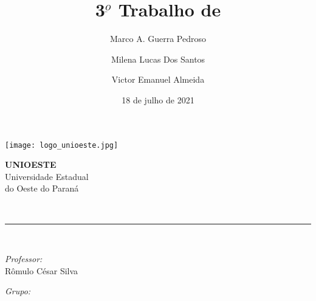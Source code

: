 \documentclass[12pt, a4paper]{article}
\author{Marco A. Guerra Pedroso\and Milena Lucas Dos Santos\and Victor Emanuel Almeida}
\title{3$^{\underbar{o}}$ Trabalho de \materia}
\date{18 de julho de 2021}
\newcommand{\prof}{Rômulo César Silva}
\begin{document}
\begin{titlepage}
    \centering
    \thispagestyle{fancy}

    \begin{minipage}{0.4\textwidth}
        \begin{flushleft}
            \texttt{[image: logo\_unioeste.jpg]}\\[1.0 cm]
        \end{flushleft}
    \end{minipage}
    \begin{minipage}{0.5\textwidth}
        \begin{flushright}\large
            \textsc{\LARGE\textbf{UNIOESTE}}\\
            \vspace{1cm}
            Universidade Estadual\\do Oeste do Paraná
        \end{flushright}
    \end{minipage}
    \vspace*{4.5 cm}

    {\huge\bfseries\thetitle}\\
    \rule{\linewidth}{0.2 mm}\\[1.5 cm]

    \vspace{2cm}
    \begin{minipage}[t]{0.4\textwidth}
        \begin{flushleft}\large
            \emph{Professor:}\\
            \prof\\
        \end{flushleft}
    \end{minipage}
    \begin{minipage}[t]{0.5\textwidth}

        \begin{flushright}\large
            \emph{Grupo:}\\
            \theauthor
        \end{flushright}

    \end{minipage}\\[2 cm]

    \vfill\thedate
\end{titlepage}

\pagestyle{fancy}
\fancyfoot[L]{}
\fancyhead[L]{}
\fancyhead[R]{}
\end{document}
